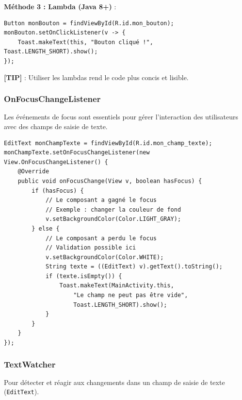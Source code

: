 \documentclass[11pt,a4paper]{article}
\begin{document}
\textbf{Méthode 3 : Lambda (Java 8+)} :
\begin{lstlisting}
Button monBouton = findViewById(R.id.mon_bouton);
monBouton.setOnClickListener(v -> {
    Toast.makeText(this, "Bouton cliqué !", Toast.LENGTH_SHORT).show();
});
\end{lstlisting}

\textbf{[TIP]} : Utiliser les lambdas rend le code plus concis et lisible.

\subsubsection{OnFocusChangeListener}

Les événements de focus sont essentiels pour gérer l'interaction des utilisateurs avec des champs de saisie de texte.

\begin{lstlisting}
EditText monChampTexte = findViewById(R.id.mon_champ_texte);
monChampTexte.setOnFocusChangeListener(new View.OnFocusChangeListener() {
    @Override
    public void onFocusChange(View v, boolean hasFocus) {
        if (hasFocus) {
            // Le composant a gagné le focus
            // Exemple : changer la couleur de fond
            v.setBackgroundColor(Color.LIGHT_GRAY);
        } else {
            // Le composant a perdu le focus
            // Validation possible ici
            v.setBackgroundColor(Color.WHITE);
            String texte = ((EditText) v).getText().toString();
            if (texte.isEmpty()) {
                Toast.makeText(MainActivity.this, 
                    "Le champ ne peut pas être vide", 
                    Toast.LENGTH_SHORT).show();
            }
        }
    }
});
\end{lstlisting}

\subsubsection{TextWatcher}

Pour détecter et réagir aux changements dans un champ de saisie de texte (\texttt{EditText}).
\end{document}
